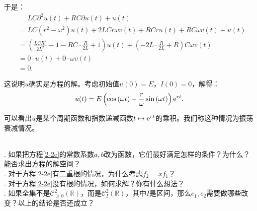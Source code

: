 \documentclass[12pt,UTF8]{ctexbook}
\begin{document}
\begin{so}
    于是：
    \begin{align*}
        &\quad\,\, LC\partial^2 u(t) + RC\partial u(t) + u(t) \\
        &= LC(r^2 - \omega^2)u(t) + 2LCr\omega v(t) + RCru(t) + RC\omega v(t) +u(t) \\
        &= \left(\frac{LCR^2}{2L^2} - 1 - RC\cdot \frac{R}{2L} + 1\right)u(t) + \left(- 2L\cdot \frac{R}{2L} + R\right)C\omega v(t) \\
        &= 0 \cdot u(t) + 0\cdot \omega v(t) \\
        &= 0.
    \end{align*}

    这说明$u$确实是方程的解。考虑初始值$u(0) = E$，$I(0) = 0$，解得：
    $$ u(t) =  E\left(\cos{(\omega t)} - \frac{r}{\omega}\sin{(\omega t)}\right)\mathrm{e}^{rt}. $$

    可以看出$u$是某个周期函数和指数递减函数$t\mapsto \mathrm{e}^{rt}$的乘积。我们称这种情况为振荡衰减情况。

\end{so}

\begin{sk}
    \mbox{} \\
    . 如果把方程\eqref{2-2e}的常数系数$a,b$改为函数，它们最好满足怎样的条件？为什么？
    能否求出方程的解空间？\\
    . 对于方程\eqref{2-2e}有二重根的情况，为什么考虑$f_2 = xf_1$？\\
    . 对于方程\eqref{2-2e}没有根的情况，如何求解？你有什么想法？\\
    . 如果全集不是$\mathcal{C}^2_{\geqslant 0}(\mathbb{R})$，而是$\mathcal{C}^2_I(\mathbb{R})$，其中$I$是区间，那么$e_1, e_2$需要做哪些改变？以上的结论是否还成立？
    
\end{sk}
\end{document}
